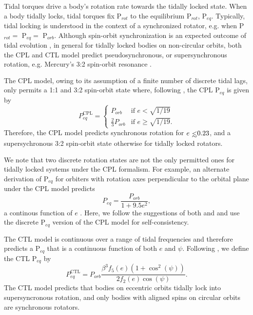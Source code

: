 Tidal torques drive a body's rotation rate towards the tidally locked state. When a body tidally locks, tidal torques fix P$_{rot}$ to the equilibrium P$_{rot}$, P$_{eq}$.  Typically, tidal locking is understood in the context of a synchronized rotator, e.g. when P$_{rot} = $ P$_{eq} = $ P$_{orb}$. Although spin-orbit synchronization is an expected outcome of tidal evolution \citep{Counselman1973}, in general for tidally locked bodies on non-circular orbits, both the CPL and CTL model predict pseudosynchronous, or supersynchronous rotation, e.g. Mercury's 3:2 spin-orbit resonance \citep[P$_{rot} = 2/3$ P$_{orb}$,][]{GoldreichPeale1966}.   

The CPL model, owing to its assumption of a finite number of discrete tidal lags, only permits a 1:1 and 3:2 spin-orbit state where, following \citet{Barnes2017}, the CPL P$_{eq}$ is given by
\begin{equation} \label{sync:eqn:cpl:eqPer}
P^{\mathrm{CPL}}_{eq} = 
\begin{cases}
P_{orb} & \text{if } e < \sqrt{1/19}\\
\frac{2}{3}P_{orb} & \text{if } e \geq \sqrt{1/19}.
\end{cases}
\end{equation}
Therefore, the CPL model predicts synchronous rotation for $e \lsim 0.23$, and a supersychronous 3:2 spin-orbit state otherwise for tidally locked rotators.

We note that two discrete rotation states are not the only permitted ones for tidally locked systems under the CPL formalism. For example, an alternate derivation of P$_{eq}$ for orbiters with rotation axes perpendicular to the orbital plane under the CPL model predicts
\begin{equation} \label{sync:eqn:cpl:eqPerCont}
P_{eq} = \frac{P_{orb}}{1 + 9.5e^2},
\end{equation}
a continous function of $e$ \citep{Goldreich1966b,Murray1999}. Here, we follow the suggestions of both \citet{Barnes2013} and \citet{Barnes2017} and use the discrete P$_{eq}$ version of the CPL model for self-consistency.

The CTL model is continuous over a range of tidal frequencies and therefore predicts a P$_{eq}$ that is a continuous function of both $e$ and $\psi$.  Following \citet{Barnes2017}, we define the CTL P$_{eq}$ by
\begin{equation} \label{sync:eqn:ctl:eqPer}
P^{\mathrm{CTL}}_{eq} = P_{orb} \frac{\beta^3 f_5(e) (1 + \cos^2(\psi))}{2f_2(e) \cos(\psi)}.
\end{equation}
The CTL model predicts that bodies on eccentric orbits tidally lock into supersyncronous rotation, and only bodies with aligned spins on circular orbits are synchronous rotators. 

